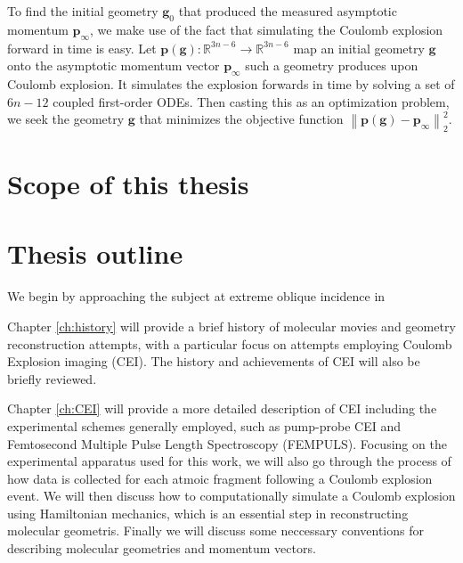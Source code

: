 To find the initial geometry $\mathbf{g}_0$ that produced the measured asymptotic momentum $\mathbf{p}_\infty$, we make use of the fact that simulating the Coulomb explosion forward in time is easy. Let $\mathbf{p}(\mathbf{g}) : \mathbb{R}^{3n-6} \rightarrow \mathbb{R}^{3n-6}$ map an initial geometry $\mathbf{g}$ onto the asymptotic momentum vector $\mathbf{p}_\infty$ such a geometry produces upon Coulomb explosion. It simulates the explosion forwards in time by solving a set of $6n-12$ coupled first-order ODEs. Then casting this as an optimization problem, we seek the geometry $\mathbf{g}$ that minimizes the objective function $\left\| \mathbf{p}(\mathbf{g}) - \mathbf{p}_\infty \right\|_2^2$.

\section{Scope of this thesis}

\section{Thesis outline}

We begin by approaching the subject at extreme oblique incidence in

Chapter \ref{ch:history} will provide a brief history of molecular movies and geometry reconstruction attempts, with a particular focus on attempts employing Coulomb Explosion imaging (CEI). The history and achievements of CEI will also be briefly reviewed.

Chapter \ref{ch:CEI} will provide a more detailed description of CEI including the experimental schemes generally employed, such as pump-probe CEI and Femtosecond Multiple Pulse Length Spectroscopy (FEMPULS). Focusing on the experimental apparatus used for this work, we will also go through the process of how data is collected for each atmoic fragment following a Coulomb explosion event. We will then discuss how to computationally simulate a Coulomb explosion using Hamiltonian mechanics, which is an essential step in reconstructing molecular geometris. Finally we will discuss some neccessary conventions for describing molecular geometries and momentum vectors.

